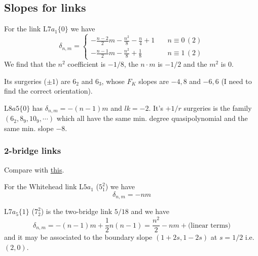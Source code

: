 \documentclass[11pt,e-only]{amsart}
\begin{document}
\subsection{Slopes for links}

\begin{example}
For the link $\mathrm{L}7a_1\{0\}$ we have
\begin{equation}
    \delta_{n,m}=\begin{cases}
        -\frac{n-2}{2}m-\frac{n^2}{8}-\frac{n}{4}+1 \quad &n\equiv 0\,(2) \\
        -\frac{n-1}{2}m-\frac{n^2}{8}+\frac18 \quad &n\equiv 1\,(2)
    \end{cases}
\end{equation}
We find that the $n^2$ coefficient is $-1/8$, the $n\cdot m$ is $-1/2$ and the $m^2$ is $0$. 

Its surgeries ($\pm 1$) are $6_2$ and $6_3$, whose $F_K$ slopes are $-4,8$ and $-6,6$ (I need to find the correct orientation). 
\end{example}

\begin{example}
$\mathrm{L}8a5\{0\}$ has $\delta_{n,m}=-(n-1)m$ and $lk=-2$. It's $+1/r$ surgeries is the family $(6_2,8_9,10_9,\cdots)$ which all have the same min. degree quasipolynomial and the same min. slope $-8$. %
\end{example}

\subsubsection{2-bridge links}

Compare with \href{https://arxiv.org/pdf/math/0505442}{this}.

\begin{example} For the Whitehead link $\mathrm{L}5a_1$ ($5_1^2$) we have
\begin{equation}
    \delta_{n,m}=-n m
\end{equation}
\end{example}

\begin{example} $\mathrm{L}7a_5\{1\}$ ($7_2^2$) is the two-bridge link $5/18$ and we have
\begin{equation}
    \delta_{n,m}=-(n - 1) m + \frac12 n(n-1) = \frac{n^2}{2}-n m+\text{(linear terms)}
\end{equation}
and it may be associated to the boundary slope $(1+2s,1-2s)$ at $s=1/2$ i.e. $(2,0)$.
\end{example}
\end{document}
